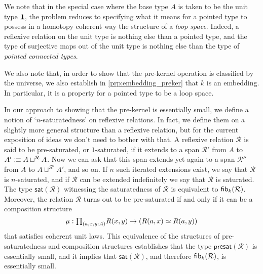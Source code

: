 We note that in the special case where the base type $A$ is taken to be the unit type $\underline{\mathbf{1}}$, the problem reduces to specifying what it means for a pointed type to possess in a homotopy coherent way the structure of a \emph{loop space}. Indeed, a reflexive relation on the unit type is nothing else than a pointed type, and the type of surjective maps out of the unit type is nothing else than the type of \emph{pointed connected types}.

We also note that, in order to show that the pre-kernel operation is classified by the universe, we also establish in \cref{prp:embedding_preker} that $k$ is an embedding. In particular, it is a property for a pointed type to be a loop space.

In our approach to showing that the pre-kernel is essentially small, we define a notion of `$n$-saturatedness' on reflexive relations. In fact, we define them on a slightly more general structure than a reflexive relation, but for the current exposition of ideas we don't need to bother with that. A reflexive relation $\mathcal{R}$ is said to be pre-saturated, or $1$-saturated, if it extends to a span $\mathcal{R}'$ from $A$ to $A'\vcentcolon\equiv A\sqcup^{\mathcal{R}}A$. Now we can ask that this span extends yet again to a span $\mathcal{R}''$ from $A$ to $A\sqcup^{\mathcal{R}'} A'$, and so on. If $n$ such iterated extensions exist, we say that $\mathcal{R}$ is $n$-saturated, and if $\mathcal{R}$ can be extended indefinitely we say that $\mathcal{R}$ is saturated. The type $\mathsf{sat}(\mathcal{R})$ witnessing the saturatedness of $\mathcal{R}$ is equivalent to $\mathsf{fib}_{k}(\mathcal{R})$. Moreover, the relation $\mathcal{R}$ turns out to be pre-saturated if and only if it can be a composition structure
\begin{equation*}
\mu : \prd{a,x,y:A} R(x,y)\to (\eqv{R(a,x)}{R(a,y)})
\end{equation*}
that satisfies coherent unit laws. This equivalence of the structures of pre-saturatedness and composition structures establishes that the type $\mathsf{presat}(\mathcal{R})$ is essentially small, and it implies that $\mathsf{sat}(\mathcal{R})$, and therefore $\mathsf{fib}_{k}(\mathcal{R})$, is essentially small.

